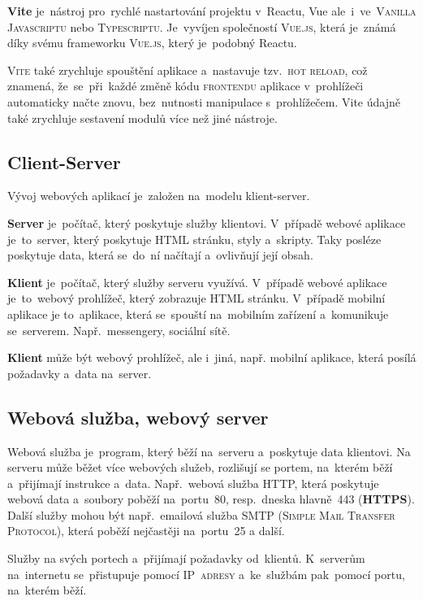 \documentclass[14pt,a4paper]{article}
\begin{document}
        \textbf{Vite} je~nástroj pro~rychlé nastartování projektu v~Reactu, Vue ale~i~ve~\textsc{Vanilla Javascriptu} nebo \textsc{Typescriptu}. Je~vyvíjen společností \textsc{Vue.js}, která je~známá díky svému frameworku \textsc{Vue.js}, který je~podobný Reactu.
        
        \textsc{Vite} také zrychluje spouštění aplikace a~nastavuje tzv.~\textsc{hot reload}, což znamená, že~se~při~každé změně kódu \textsc{frontendu} aplikace v~prohlížeči automaticky načte znovu, bez~nutnosti manipulace s~prohlížečem.
        Vite údajně také zrychluje sestavení modulů více než jiné nástroje.\parencite{vitejs}
        
        \subsection{Client-Server}
        Vývoj webových aplikací je~založen na~modelu klient-server.
        
        \textbf{Server} je~počítač, který poskytuje služby klientovi. V~případě webové aplikace je~to~server, který poskytuje HTML stránku, styly a~skripty.
        Taky posléze poskytuje data, která se~do~ní načítají a~ovlivňují její obsah.

        \textbf{Klient} je~počítač, který služby serveru využívá. V~případě webové aplikace je~to~webový prohlížeč, který zobrazuje HTML stránku.
        V~případě mobilní aplikace je to~aplikace, která se~spouští na~mobilním zařízení a~komunikuje se~serverem. Např.~messengery, sociální sítě. \parencite{ClientServer}
        
        \textbf{Klient} může být webový prohlížeč, ale i~jiná, např. mobilní aplikace, která posílá požadavky a~data na~server.

        \subsection{Webová služba, webový server}
        Webová služba je~program, který běží na~serveru a~poskytuje data klientovi. Na serveru může běžet více webových služeb, rozlišují se portem, na~kterém běží a~přijímají instrukce a~data. Např.~webová služba HTTP, která poskytuje webová data a~soubory poběží na~portu~80, resp.~dneska hlavně~443 (\textbf{HTTPS}). Další služby mohou být např.~emailová služba SMTP (\textsc{Simple Mail Transfer Protocol}), která poběží nejčastěji na~portu~25 a další.
        
        Služby  na svých portech a~přijímají požadavky od~klientů. K~serverům na~internetu se~přistupuje pomocí \textsc{IP~adresy} a~ke~službám pak~pomocí portu, na~kterém běží. \parencite{webserver:mdn}
\end{document}
